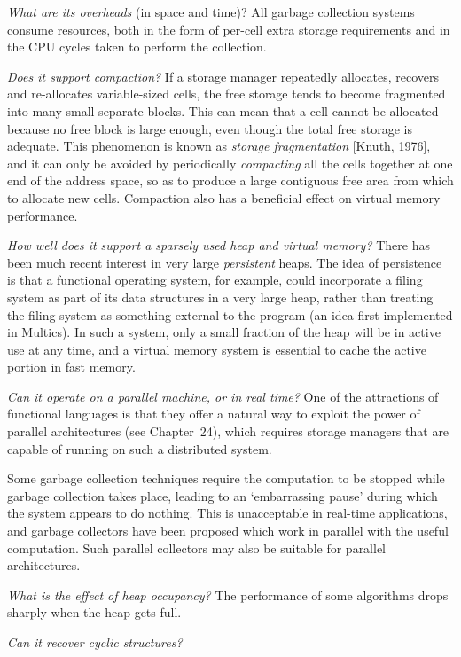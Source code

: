 \begin{numbered}
    \item \textit{What are its overheads} (in space and time)? All garbage collection
    systems consume resources, both in the form of per-cell extra storage
    requirements and in the CPU cycles taken to perform the collection.

    \item \textit{Does it support compaction?} If a storage manager repeatedly allocates,
    recovers and re-allocates variable-sized cells, the free storage tends to
    become fragmented into many small separate blocks. This can mean that
    a cell cannot be allocated because no free block is large enough, even
    though the total free storage is adequate. This phenomenon is known as
    \textit{storage fragmentation} [Knuth, 1976], and it can only be avoided by
    periodically \textit{compacting} all the cells together at one end of the address
    space, so as to produce a large contiguous free area from which to
    allocate new cells. Compaction also has a beneficial effect on virtual
    memory performance.

    \item \textit{How well does it support a sparsely used heap and virtual memory?} There
    has been much recent interest in very large \textit{persistent} heaps. The idea of
    persistence is that a functional operating system, for example, could
    incorporate a filing system as part of its data structures in a very large
    heap, rather than treating the filing system as something external to the
    program (an idea first implemented in Multics). In such a system, only a
    small fraction of the heap will be in active use at any time, and a virtual
    memory system is essential to cache the active portion in fast memory.

    \item \textit{Can it operate on a parallel machine, or in real time?} One of the
    attractions of functional languages is that they offer a natural way to
    exploit the power of parallel architectures (see Chapter~24), which
    requires storage managers that are capable of running on such a dis\-tributed system.

    Some garbage collection techniques require the computation to be
    stopped while garbage collection takes place, leading to an `embarrassing
    pause' during which the system appears to do nothing. This is unacceptable
    in real-time applications, and garbage collectors have been
    proposed which work in parallel with the useful computation. Such
    parallel collectors may also be suitable for parallel architectures.

    \item \textit{What is the effect of heap occupancy?} The performance of some
    algorithms drops sharply when the heap gets full.

    \item \textit{Can it recover cyclic structures?}
\end{numbered}

